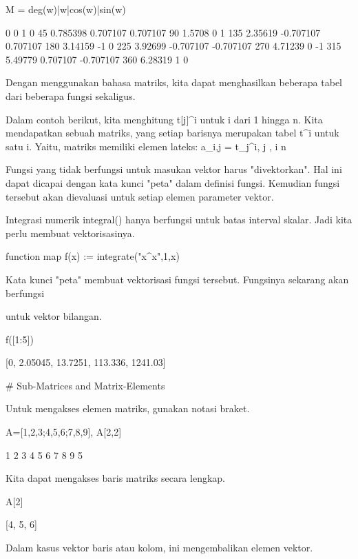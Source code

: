 \documentclass{article}
\begin{document}
\>M = deg(w)|w|cos(w)|sin(w)


                0             0             1             0 
               45      0.785398      0.707107      0.707107 
               90        1.5708             0             1 
              135       2.35619     -0.707107      0.707107 
              180       3.14159            -1             0 
              225       3.92699     -0.707107     -0.707107 
              270       4.71239             0            -1 
              315       5.49779      0.707107     -0.707107 
              360       6.28319             1             0 

Dengan menggunakan bahasa matriks, kita dapat menghasilkan beberapa
tabel dari beberapa fungsi sekaligus.


Dalam contoh berikut, kita menghitung t[j]^i untuk i dari 1 hingga n.
Kita mendapatkan sebuah matriks, yang setiap barisnya merupakan tabel
t^i untuk satu i. Yaitu, matriks memiliki elemen lateks: a_{i,j} =
t_j^i,  \le j ,  \le i \le n


Fungsi yang tidak berfungsi untuk masukan vektor harus "divektorkan".
Hal ini dapat dicapai dengan kata kunci "peta" dalam definisi fungsi.
Kemudian fungsi tersebut akan dievaluasi untuk setiap elemen parameter
vektor.


Integrasi numerik integral() hanya berfungsi untuk batas interval
skalar. Jadi kita perlu membuat vektorisasinya.


\>function map f(x) := integrate("x^x",1,x)


Kata kunci "peta" membuat vektorisasi fungsi tersebut. Fungsinya
sekarang akan berfungsi


untuk vektor bilangan.


\>f([1:5])


    [0,  2.05045,  13.7251,  113.336,  1241.03]

# Sub-Matrices and Matrix-Elements

Untuk mengakses elemen matriks, gunakan notasi braket.


\>A=[1,2,3;4,5,6;7,8,9], A[2,2]


                1             2             3 
                4             5             6 
                7             8             9 
    5

Kita dapat mengakses baris matriks secara lengkap.


\>A[2]


    [4,  5,  6]

Dalam kasus vektor baris atau kolom, ini mengembalikan elemen vektor.
\end{document}

